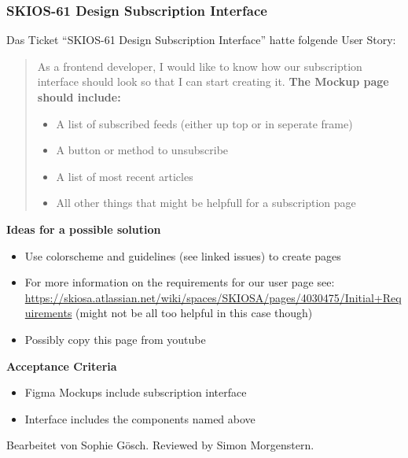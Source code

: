 \subsubsection{SKIOS-61 Design Subscription Interface}
Das Ticket \enquote{SKIOS-61 Design Subscription Interface} hatte folgende User Story:
\begin{quotation}
    As a frontend developer, I would like to know how our subscription interface should look so that I can start creating it.
    \textbf{The Mockup page should include:}
        \begin{itemize}
            \item A list of subscribed feeds (either up top or in seperate frame)
            \item A button or method to unsubscribe
            \item A list of most recent articles
            \item All other things that might be helpfull for a subscription page
        \end{itemize}
\end{quotation}
\textbf{Ideas for a possible solution}
    \begin{itemize}
        \item Use colorscheme and guidelines (see linked issues) to create pages
        \item For more information on the requirements for our user page see: \url{https://skiosa.atlassian.net/wiki/spaces/SKIOSA/pages/4030475/Initial+Requirements} (might not be all too helpful in this case though)
        \item Possibly copy this page from youtube
    \end{itemize}
\textbf{Acceptance Criteria}
    \begin{itemize}
        \item Figma Mockups include subscription interface
        \item Interface includes the components named above
    \end{itemize}
Bearbeitet von Sophie Gösch.
Reviewed by Simon Morgenstern.

